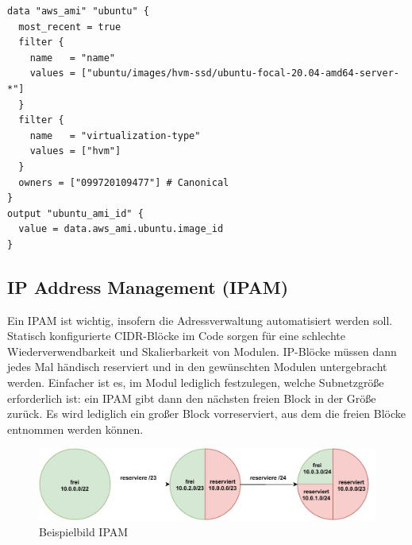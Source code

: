 \begin{verbatim}
data "aws_ami" "ubuntu" {
  most_recent = true
  filter {
    name   = "name"
    values = ["ubuntu/images/hvm-ssd/ubuntu-focal-20.04-amd64-server-*"]
  }
  filter {
    name   = "virtualization-type"
    values = ["hvm"]
  }
  owners = ["099720109477"] # Canonical
}
output "ubuntu_ami_id" {
  value = data.aws_ami.ubuntu.image_id
}
\end{verbatim}

\subsection{IP Address Management (IPAM)}
Ein IPAM ist wichtig, insofern die Adressverwaltung automatisiert werden soll. Statisch konfigurierte CIDR-Blöcke im Code sorgen für eine schlechte Wiederverwendbarkeit und Skalierbarkeit von Modulen. IP-Blöcke müssen dann jedes Mal händisch reserviert und in den gewünschten Modulen untergebracht werden. Einfacher ist es, im Modul lediglich festzulegen, welche Subnetzgröße erforderlich ist: ein IPAM gibt dann den nächsten freien Block in der Größe zurück. Es wird lediglich ein großer Block vorreserviert, aus dem die freien Blöcke entnommen werden können.

\begin{figure}[h]
  \centering
  \includegraphics{Figures/ipam_cake.pdf}
  \caption{Beispielbild IPAM}
  \label{grafik: ipam_ip_reservation}
\end{figure}\FloatBarrier
